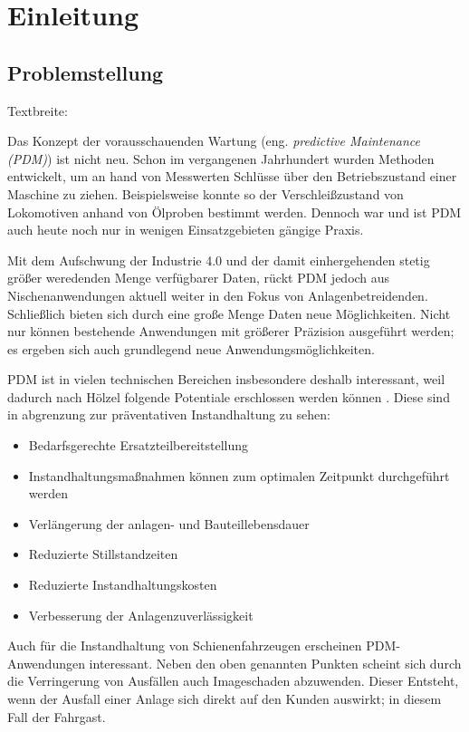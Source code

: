 \chapter{Einleitung}
\label{ch:einleitung}

\section{Problemstellung}
\label{sec:motivation}
Textbreite:\the\textwidth

Das Konzept der vorausschauenden Wartung (eng. \textit{predictive Maintenance (PDM)}) ist nicht neu. Schon im vergangenen Jahrhundert wurden Methoden entwickelt, um an hand von Messwerten Schlüsse über den Betriebszustand einer Maschine zu ziehen. Beispielsweise konnte so der Verschleißzustand von Lokomotiven anhand von Ölproben bestimmt werden.  Dennoch war und ist PDM auch heute noch nur in wenigen Einsatzgebieten gängige Praxis.

Mit dem Aufschwung der Industrie 4.0 und der damit einhergehenden stetig größer weredenden Menge verfügbarer Daten, rückt PDM jedoch aus Nischenanwendungen aktuell weiter in den Fokus von Anlagenbetreidenden. Schließlich bieten sich durch eine große Menge Daten neue Möglichkeiten. Nicht nur können bestehende Anwendungen mit größerer Präzision ausgeführt werden; es ergeben sich auch grundlegend neue Anwendungsmöglichkeiten. 

PDM ist in vielen technischen Bereichen insbesondere deshalb interessant, weil  dadurch nach Hölzel folgende Potentiale erschlossen werden können . Diese sind in abgrenzung zur präventativen Instandhaltung zu sehen:
\begin{itemize}
	\item Bedarfsgerechte Ersatzteilbereitstellung
	\item Instandhaltungsmaßnahmen können zum optimalen Zeitpunkt durchgeführt werden
	\item Verlängerung der anlagen- und Bauteillebensdauer
	\item Reduzierte Stillstandzeiten
	\item Reduzierte Instandhaltungskosten
	\item Verbesserung der Anlagenzuverlässigkeit
\end{itemize}

Auch für die Instandhaltung von Schienenfahrzeugen erscheinen PDM-Anwendungen interessant. Neben den oben genannten Punkten scheint sich durch die Verringerung von Ausfällen auch Imageschaden abzuwenden. Dieser Entsteht, wenn  der Ausfall einer Anlage sich direkt auf den Kunden auswirkt; in diesem Fall der Fahrgast.

